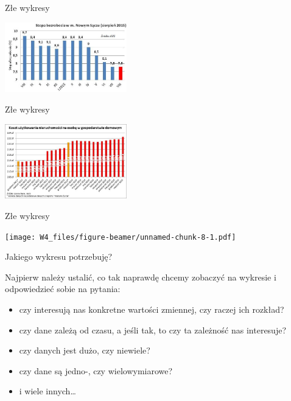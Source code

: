 \documentclass[ignorenonframetext,]{beamer}
\providecommand{\tightlist}{%
\setlength{\itemsep}{0pt}\setlength{\parskip}{0pt}}
\begin{document}
\begin{frame}{Złe wykresy}

\begin{center}\includegraphics[width=200px]{images/bezrobocie01} \end{center}

\end{frame}

\begin{frame}{Złe wykresy}

\begin{center}\includegraphics[width=200px]{images/koszt_utrzymania} \end{center}

\end{frame}

\begin{frame}{Złe wykresy}

\texttt{[image: W4\_files/figure-beamer/unnamed-chunk-8-1.pdf]}

\end{frame}

\begin{frame}{Jakiego wykresu potrzebuję?}

Najpierw należy ustalić, co tak naprawdę chcemy zobaczyć na wykresie i
odpowiedzieć sobie na pytania:

\begin{itemize}
\tightlist
\item
  czy interesują nas konkretne wartości zmiennej, czy raczej ich
  rozkład?
\item
  czy dane zależą od czasu, a jeśli tak, to czy ta zależność nas
  interesuje?
\item
  czy danych jest dużo, czy niewiele?
\item
  czy dane są jedno-, czy wielowymiarowe?
\item
  i wiele innych\ldots{}
\end{itemize}

\end{frame}
\end{document}

